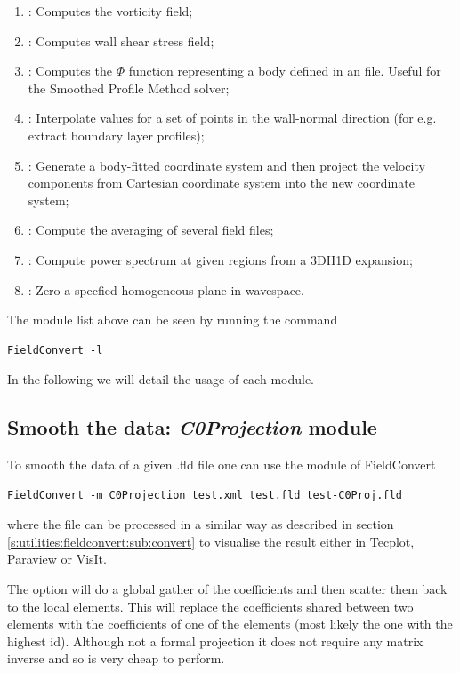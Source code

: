 \begin{enumerate}
\item {}: Computes the vorticity field;
\item {}: Computes wall shear stress field;
\item {}: Computes the $\Phi$ function representing a body defined
  in an  file. Useful for the Smoothed Profile Method solver;
\item {}: Interpolate values for a set of points in the wall-normal direction (for e.g. extract boundary layer profiles);
\item {}: Generate a body-fitted coordinate system and then
  project the velocity components from Cartesian coordinate system into the new 
  coordinate system;
\item {}: Compute the averaging of several field files;
\item {}: Compute power spectrum at given regions from a 3DH1D expansion;
\item {}: Zero a specfied homogeneous plane in wavespace.
\end{enumerate}
The module list above can be seen by running the command
%
\begin{lstlisting}[style=BashInputStyle]
FieldConvert -l
\end{lstlisting}
%
In the following we will detail the usage of each module.
%
%
%

\subsection{Smooth the data: \textit{C0Projection} module}
To smooth the data of a given .fld file one can
use the  module of FieldConvert
%
\begin{lstlisting}[style=BashInputStyle]
FieldConvert -m C0Projection test.xml test.fld test-C0Proj.fld
\end{lstlisting}
%
where the file  can be processed in a similar
way as described in section \ref{s:utilities:fieldconvert:sub:convert}
to visualise the result either in Tecplot, Paraview or VisIt.

The option  will do a global gather of the
coefficients and then scatter them back to the local elements. This
will replace the coefficients shared between two elements with the
coefficients of one of the elements (most likely the one with the
highest id). Although not a formal projection it does not require any
matrix inverse and so is very cheap to perform.

